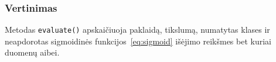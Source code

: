 \subsubsection{Vertinimas}
\label{subsubsec:vertinimas}

Metodas \texttt{evaluate()} apskaičiuoja paklaidą, tikslumą, numatytas klases ir neapdorotas sigmoidinės funkcijos~\eqref{eq:sigmoid} išėjimo reikšmes bet kuriai duomenų aibei.